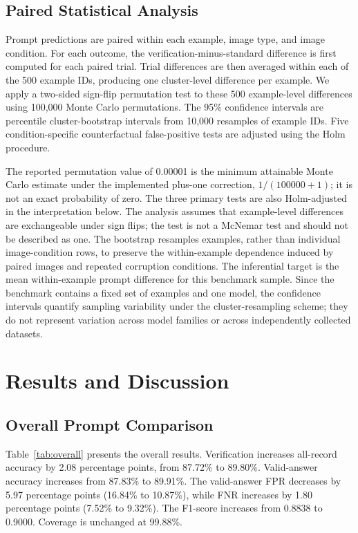 \documentclass[conference]{IEEEtran}
\begin{document}
\subsection{Paired Statistical Analysis}
Prompt predictions are paired within each example, image type, and image condition. For each outcome, the verification-minus-standard difference is first computed for each paired trial. Trial differences are then averaged within each of the 500 example IDs, producing one cluster-level difference per example. We apply a two-sided sign-flip permutation test to these 500 example-level differences using 100,000 Monte Carlo permutations. The 95\% confidence intervals are percentile cluster-bootstrap intervals from 10,000 resamples of example IDs. Five condition-specific counterfactual false-positive tests are adjusted using the Holm procedure.

The reported permutation value of 0.00001 is the minimum attainable Monte Carlo estimate under the implemented plus-one correction, $1/(100000+1)$; it is not an exact probability of zero. The three primary tests are also Holm-adjusted in the interpretation below. The analysis assumes that example-level differences are exchangeable under sign flips; the test is not a McNemar test and should not be described as one. The bootstrap resamples examples, rather than individual image-condition rows, to preserve the within-example dependence induced by paired images and repeated corruption conditions. The inferential target is the mean within-example prompt difference for this benchmark sample. Since the benchmark contains a fixed set of examples and one model, the confidence intervals quantify sampling variability under the cluster-resampling scheme; they do not represent variation across model families or across independently collected datasets.

\section{Results and Discussion}
\subsection{Overall Prompt Comparison}
Table~\ref{tab:overall} presents the overall results. Verification increases all-record accuracy by 2.08 percentage points, from 87.72\% to 89.80\%. Valid-answer accuracy increases from 87.83\% to 89.91\%. The valid-answer FPR decreases by 5.97 percentage points (16.84\% to 10.87\%), while FNR increases by 1.80 percentage points (7.52\% to 9.32\%). The F1-score increases from 0.8838 to 0.9000. Coverage is unchanged at 99.88\%.
\end{document}
